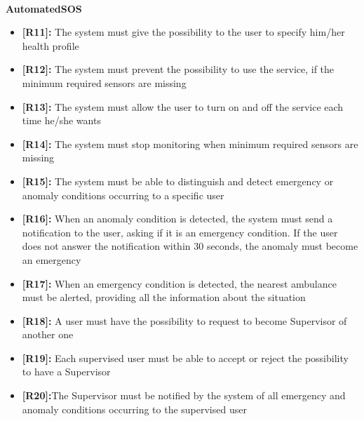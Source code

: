 \paragraph{}
\textbf{AutomatedSOS}
\begin{itemize}
\item\textbf{[R11]:} The system must give the possibility to the user to specify him/her health profile
\item\textbf{[R12]:} The system must prevent the possibility to use the service, if the minimum required sensors are missing
\item\textbf{[R13]:} The system must allow the user to turn on and off the service each time he/she wants
\item\textbf{[R14]:} The system must stop monitoring when minimum required sensors are missing
\item\textbf{[R15]:} The system must be able to distinguish and detect emergency or anomaly conditions occurring to a specific user
\item\textbf{[R16]:} When an anomaly condition is detected, the system must send a notification to the user, asking if it is an emergency condition. If the user does not answer the notification within 30 seconds, the anomaly must become an emergency
\item\textbf{[R17]:} When an emergency condition is detected, the nearest ambulance must be alerted, providing all the information about the situation
\item\textbf{[R18]:} A user must have the possibility to request to become Supervisor of another one
\item\textbf{[R19]:} Each supervised user must be able to accept or reject the possibility to have a Supervisor
\item\textbf{[R20]:}The Supervisor must be notified by the system of all emergency and anomaly conditions occurring to the supervised user
\end{itemize}

\paragraph{}
{}


